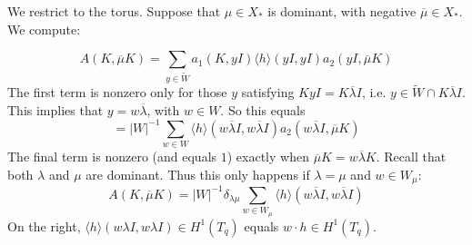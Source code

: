 \documentclass[10pt]{amsart}
\newcommand{\mubar}{\overline{\mu}}
\newcommand{\lambdabar}{\overline{\lambda}}
\theoremstyle{remark}
\begin{document}

   
   
   
We restrict to the torus. Suppose that $\mu \in X_*$  is  dominant, with negative $\mubar \in X_*$.  We compute: 

 $$A (K,\mubar K) = \sum_{  y \in   \tilde{W}} a_1(K,yI) \langle h \rangle (yI,yI)  a_2(yI, \mubar K)$$
 The first term is nonzero only 
 for those $y$ satisfying $K y I = K \lambdabar I$, i.e. $y \in \tilde{W} \cap K  \lambdabar I$. 
This implies that
  $y = w \lambdabar$, with $w \in W$. 
So this equals 
 $$ = |W|^{-1} \sum_{w \in W} \langle h \rangle (w \lambdabar I, w \lambdabar I) a_2(w \lambdabar I, \mubar K)  $$
 The final term is nonzero (and equals $1$) exactly when $\mubar K  =  w \lambdabar K$.    Recall  that both $\lambda$ and $\mu$ are dominant.
  Thus  this only happens if $\lambda = \mu$ and $w \in W_{\mu}$: 
\begin{equation} \label{Derived} A(K,  \mubar K) =   |W|^{-1} \delta_{\lambda \mu}  \sum_{w \in W_{\mu}} \langle h \rangle (w \lambdabar I, w \lambdabar I) \end{equation} 
   On the right, $\langle h \rangle (w \lambda I, w \lambda I) \in H^1(T_q)$
equals   $w \cdot h \in H^1(T_q)$.  
\end{document}
